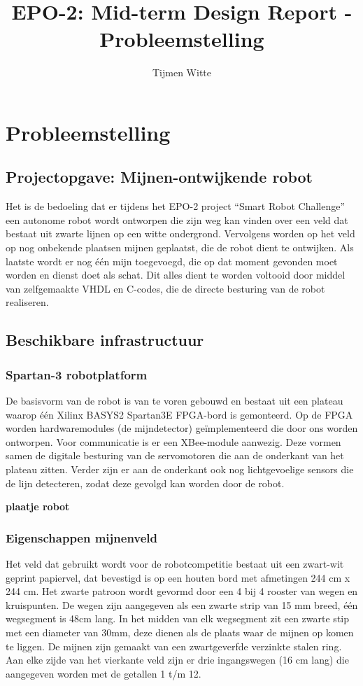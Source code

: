 \documentclass{report}
\title{EPO-2: Mid-term Design Report - Probleemstelling}
\author{Tijmen Witte}
\begin{document}
\chapter{Probleemstelling}
\label{ch:probleemstelling}

\section{Projectopgave: Mijnen-ontwijkende robot}

Het is de bedoeling dat er tijdens het EPO-2 project “Smart Robot Challenge” een autonome robot wordt ontworpen die zijn weg kan vinden over een veld dat bestaat uit zwarte lijnen op een witte ondergrond.
Vervolgens worden op het veld op nog onbekende plaatsen mijnen geplaatst, die de robot dient te ontwijken.
Als laatste wordt er nog één mijn toegevoegd, die op dat moment gevonden moet worden en dienst doet als schat.
Dit alles dient te worden voltooid door middel van zelfgemaakte VHDL en C-codes, die de directe besturing van de robot realiseren.


\section{Beschikbare infrastructuur}
\subsection{Spartan-3 robotplatform}

De basisvorm van de robot is van te voren gebouwd en bestaat uit een plateau waarop één Xilinx BASYS2 Spartan3E FPGA-bord is gemonteerd.
Op de FPGA worden hardwaremodules (de mijndetector) geïmplementeerd die door ons worden ontworpen.
Voor communicatie is er een XBee-module aanwezig.
Deze vormen samen de digitale besturing van de servomotoren die aan de onderkant van het plateau zitten.
Verder zijn er aan de onderkant ook nog lichtgevoelige sensors die de lijn detecteren, zodat deze gevolgd kan worden door de robot.

\textbf{plaatje robot}

\subsection{Eigenschappen mijnenveld}

Het veld dat gebruikt wordt voor de robotcompetitie bestaat uit een zwart-wit geprint papiervel, dat bevestigd is op een houten bord met afmetingen 244 cm x 244 cm.
Het zwarte patroon wordt gevormd door een 4 bij 4 rooster van wegen en kruispunten.
De wegen zijn aangegeven als een zwarte strip van 15 mm breed, één wegsegment is 48cm lang.
In het midden van elk wegsegment zit een zwarte stip met een diameter van 30mm, deze dienen als de plaats waar de mijnen op komen te liggen.
De mijnen zijn gemaakt van een zwartgeverfde verzinkte stalen ring.
Aan elke zijde van het vierkante veld zijn er drie ingangswegen (16 cm lang) die aangegeven worden met de getallen 1 t/m 12.
\end{document}
